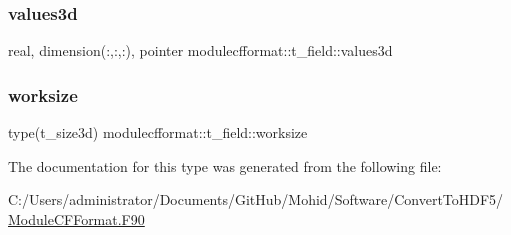 \mbox{\label{structmodulecfformat_1_1t__field_a95f3da64caf70d29fb9770eb2583c22f}} 
\subsubsection{\texorpdfstring{values3d}{values3d}}
{\footnotesize\ttfamily real, dimension(\+:,\+:,\+:), pointer modulecfformat\+::t\+\_\+field\+::values3d\hspace{0.3cm}{\ttfamily [private]}}

\mbox{\label{structmodulecfformat_1_1t__field_a309689128789a7d5dd913d3f40385e53}} 
\subsubsection{\texorpdfstring{worksize}{worksize}}
{\footnotesize\ttfamily type(t\+\_\+size3d) modulecfformat\+::t\+\_\+field\+::worksize\hspace{0.3cm}{\ttfamily [private]}}



The documentation for this type was generated from the following file\+:\begin{DoxyCompactItemize}
\item 
C\+:/\+Users/administrator/\+Documents/\+Git\+Hub/\+Mohid/\+Software/\+Convert\+To\+H\+D\+F5/\mbox{\hyperlink{_module_c_f_format_8_f90}{Module\+C\+F\+Format.\+F90}}\end{DoxyCompactItemize}
